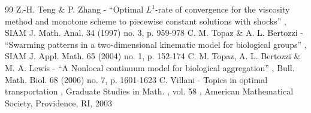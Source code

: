 \documentclass[11pt]{article}
\numberwithin{equation}{section}
\theoremstyle{plain}
\theoremstyle{definition}
\begin{document}
\begin{thebibliography}{99}
 Z.-H. Teng \& P. Zhang - “Optimal $L^1$-rate of convergence for the viscosity method and monotone scheme to piecewise constant solutions with shocks” , SIAM J. Math. Anal. 34 (1997) no. 3, p. 959-978
 C. M. Topaz \& A. L. Bertozzi - “Swarming patterns in a two-dimensional kinematic model for biological groups” , SIAM J. Appl. Math. 65 (2004) no. 1, p. 152-174
 C. M. Topaz, A. L. Bertozzi \& M. A. Lewis - “A Nonlocal continuum model for biological aggregation” , Bull. Math. Biol. 68 (2006) no. 7, p. 1601-1623
 C. Villani - Topics in optimal transportation , Graduate Studies in Math. , vol. 58 , American Mathematical Society, Providence, RI, 2003
\end{thebibliography}
\end{document}
